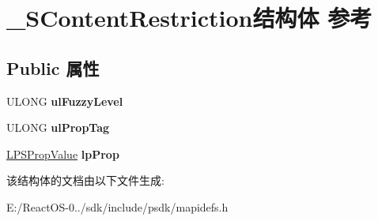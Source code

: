 \hypertarget{struct___s_content_restriction}{}\section{\+\_\+\+S\+Content\+Restriction结构体 参考}
\label{struct___s_content_restriction}
\subsection*{Public 属性}
\begin{DoxyCompactItemize}
\item 
\mbox{\label{struct___s_content_restriction_af80b161e9e9ed3a17a6b71677592ec68}} 
U\+L\+O\+NG {\bfseries ul\+Fuzzy\+Level}
\item 
\mbox{\label{struct___s_content_restriction_ae4dd7939181894157a0082d833bc3979}} 
U\+L\+O\+NG {\bfseries ul\+Prop\+Tag}
\item 
\mbox{\label{struct___s_content_restriction_a0154f08f7f18521c242f7526b446a379}} 
\hyperlink{struct___s_prop_value}{L\+P\+S\+Prop\+Value} {\bfseries lp\+Prop}
\end{DoxyCompactItemize}


该结构体的文档由以下文件生成\+:\begin{DoxyCompactItemize}
\item 
E\+:/\+React\+O\+S-\/0../sdk/include/psdk/mapidefs.\+h\end{DoxyCompactItemize}

